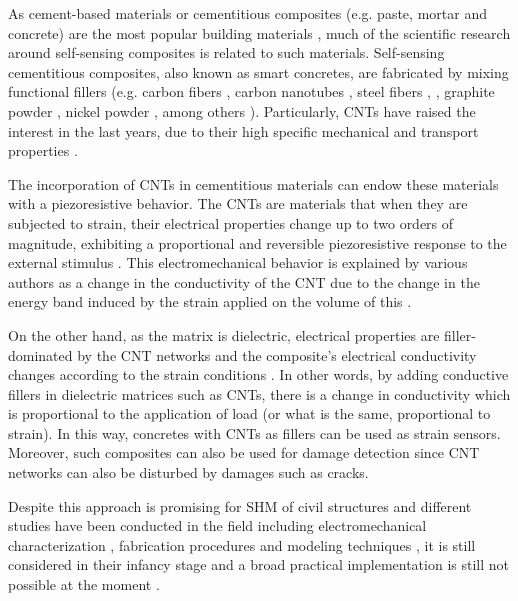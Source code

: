 \documentclass[twocolumn]{bmcart}%
\begin{document}
As cement-based materials or cementitious composites (e.g. paste, mortar and concrete) are the most popular building materials \cite{Xu2017a}, much of the scientific research around self-sensing composites is related to such materials. Self-sensing cementitious composites, also known as smart concretes, are fabricated by mixing functional fillers (e.g. carbon fibers \cite{Baeza2013a,Teomete2015, Sarwary2019a}, carbon nanotubes \cite{Elkashef2015a}, steel fibers \cite{Kang2018b}, \cite{Ding2019}, graphite powder \cite{Simonova2018}, nickel powder \cite{Wang2015} , among others \cite{Tian2019a}). Particularly, CNTs have raised the interest in the last years, due to their high specific mechanical and transport properties \cite{Schumacher2014,Ubertini2016}. 

The incorporation of CNTs in cementitious materials can endow these materials with a piezoresistive behavior. The CNTs are materials that when they are subjected to strain, their electrical properties change up to two orders of magnitude, exhibiting a proportional and reversible piezoresistive response to the external stimulus \cite{Garcia-Macias2017, Garcia-Macias2017a, Minot2003}. This electromechanical behavior is explained by various authors as a change in the conductivity of the CNT due to the change in the energy band induced by the strain applied on the volume of this \cite{Minot2003, PHAM2008, Han2015, Njuguna2012, Tjong2009, XinxinSun2009}. 

On the other hand, as the matrix is dielectric, electrical properties are filler-dominated by the CNT networks and the composite’s electrical conductivity changes according to the strain conditions \cite{Tian2019a}. In other words, by adding conductive fillers in dielectric matrices such as CNTs, there is a change in conductivity which is proportional to the application of load (or what is the same, proportional to strain). In this way, concretes with CNTs as fillers can be used as strain sensors. Moreover, such composites can also be used for damage detection since CNT networks can also be disturbed by damages such as cracks.

Despite this approach is promising for SHM of civil structures and different studies have been conducted in the field including electromechanical characterization \cite{Ubertini2014, Meoni2018a, Liu2019, Kim2019a}, fabrication procedures \cite{DAlessandro2016, Parvaneh2019a} and modeling techniques \cite{Garcia-Macias2017, Eftekhari2014, Garcia-Macias2018b}, it is still considered in their infancy stage and a broad practical implementation is still not possible at the moment \cite{Taheri2019a}. 
\end{document}
